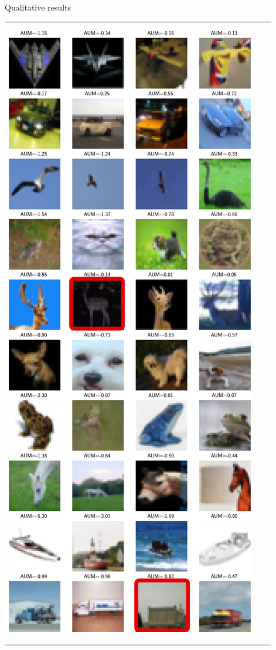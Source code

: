 \begin{frame}[t]{Qualitative results}{}
\begin{tabular}{ccc}
\begin{onlyenv}
            \includegraphics[width=.3\textwidth, clip, trim={0cm 0cm 0cm 12cm}]{../chapters/images/lowest_aum_cut.pdf}
            \end{onlyenv}%
        \\
    \end{tabular}
\end{frame}

